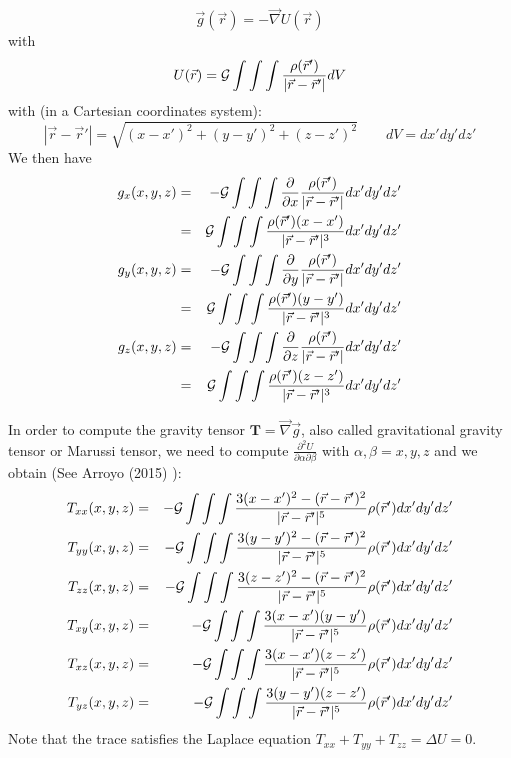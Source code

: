 
\[
\vec g (\vec r) = -\vec\nabla U (\vec r)
\]
with 
\[
U(\vec r) = {\cal G} \int\int\int \frac{\rho(\vec r')}{|\vec r-\vec r'|}dV
\]
with (in a Cartesian coordinates system):
\[
|\vec r-\vec r'|=\sqrt{(x-x')^2 + (y-y')^2 + (z-z')^2}
\qquad dV = dx'dy'dz'
\]
We then have 
\begin{eqnarray}
g_x (x,y,z) 
&=& - {\cal G} \int\int\int \frac{\partial }{\partial x} \frac{\rho(\vec r')}{|\vec r-\vec r'|}dx'dy'dz' \nonumber\\
&=&  {\cal G} \int\int\int \frac{\rho(\vec r') (x-x')}{|\vec r-\vec r'|^3}dx'dy'dz' \nonumber\\
g_y (x,y,z) 
&=& - {\cal G} \int\int\int \frac{\partial }{\partial y} \frac{\rho(\vec r')}{|\vec r-\vec r'|}dx'dy'dz' \nonumber\\
&=&  {\cal G} \int\int\int \frac{\rho(\vec r') (y-y')}{|\vec r-\vec r'|^3}dx'dy'dz' \nonumber\\
g_z (x,y,z) 
&=& - {\cal G} \int\int\int \frac{\partial }{\partial z} \frac{\rho(\vec r')}{|\vec r-\vec r'|}dx'dy'dz' \nonumber\\
&=&  {\cal G} \int\int\int \frac{\rho(\vec r') (z-z')}{|\vec r-\vec r'|^3}dx'dy'dz' \nonumber
\end{eqnarray}

In order to compute the gravity tensor ${\bm T}=\vec\nabla \vec g$, also called gravitational gravity tensor \cite{ruys11}
or Marussi tensor,  
we need to compute $\frac{\partial^2 U}{\partial \alpha \partial \beta}$ with $\alpha,\beta=x,y,z$
and we obtain (See Arroyo \etal (2015) \cite{arct15}):
\begin{eqnarray}
T_{xx}(x,y,z)&=& -{\cal G} \int\int\int \frac{3(x-x')^2-({\vec r}-{\vec r}')^2}{|{\vec r}-{\vec r}'|^5} \rho({\vec r}') dx'dy'dz' \\
T_{yy}(x,y,z)&=& -{\cal G} \int\int\int \frac{3(y-y')^2-({\vec r}-{\vec r}')^2}{|{\vec r}-{\vec r}'|^5} \rho({\vec r}') dx'dy'dz' \\
T_{zz}(x,y,z)&=& -{\cal G} \int\int\int \frac{3(z-z')^2-({\vec r}-{\vec r}')^2}{|{\vec r}-{\vec r}'|^5} \rho({\vec r}') dx'dy'dz' \\
T_{xy}(x,y,z)&=& -{\cal G} \int\int\int \frac{3(x-x')(y-y')}{|{\vec r}-{\vec r}'|^5}  \rho({\vec r}') dx'dy'dz' \\
T_{xz}(x,y,z)&=& -{\cal G} \int\int\int \frac{3(x-x')(z-z')}{|{\vec r}-{\vec r}'|^5}  \rho({\vec r}') dx'dy'dz' \\
T_{yz}(x,y,z)&=& -{\cal G} \int\int\int \frac{3(y-y')(z-z')}{|{\vec r}-{\vec r}'|^5}  \rho({\vec r}') dx'dy'dz' 
\end{eqnarray}
Note that the trace satisfies the Laplace equation $T_{xx}+T_{yy}+T_{zz}=\Delta U = 0$.

